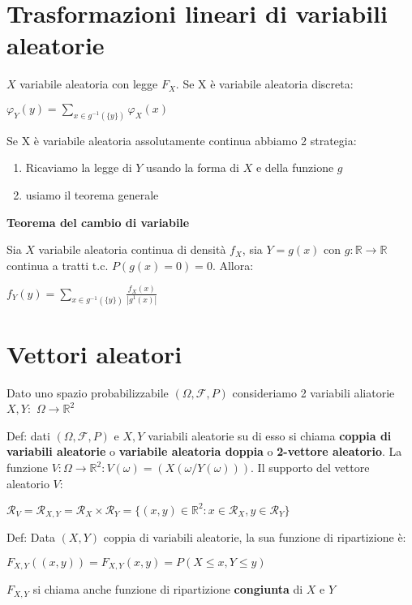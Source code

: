 \documentclass[11pt, letterpaper]{article}
\begin{document}
\newpage
\section{Trasformazioni lineari di variabili aleatorie}

$X$ variabile aleatoria con legge $F_{X}$. Se X è variabile aleatoria discreta:
\begin{center}
    $\varphi_{Y}(y)=\sum_{x\in g^{-1}(\{y\})}\varphi_{X}(x)$
\end{center}
Se X è variabile aleatoria assolutamente continua abbiamo 2 strategia:
\begin{enumerate}
    \item Ricaviamo la legge di $Y$ usando la forma di $X$ e della funzione $g$
    \item usiamo il teorema generale
\end{enumerate}

\textbf{Teorema del cambio di variabile}

Sia $X$ variabile aleatoria continua di densità $f_{X}$, sia $Y=g(x)$ con $g:\mathbb{R}\rightarrow\mathbb{R}$
continua a tratti t.c. $P(g(x)=0)=0$. Allora:
\begin{center}
    $f_{Y}(y)=\sum_{x\in g^{-1}(\{y\})}\frac{f_{X}(x)}{|g^{1}(x)|} $
\end{center}

\section{Vettori aleatori}
Dato uno spazio probabilizzabile $(\Omega,\mathcal{F},P)$ consideriamo 2 variabili aliatorie $X,Y: $
$\Omega\rightarrow$$\mathbb{R}^{2}$

Def: dati $(\Omega,\mathcal{F},P)$ e $X,Y$ variabili aleatorie su di esso si chiama \textbf{coppia di variabili aleatorie}
o \textbf{variabile aleatoria doppia} o \textbf{2-vettore aleatorio}. La funzione $V:\Omega\rightarrow\mathbb{R}^{2}:
V(\omega)=(X(\omega/Y(\omega)))$. Il supporto del vettore aleatorio $V$:
\begin{center}
    $\mathcal{R}_{V}=\mathcal{R}_{X,Y}=\mathcal{R}_{X}\times\mathcal{R}_{Y}=\{(x,y)\in\mathbb{R}^{2}:x\in\mathcal{R}_{X}
    , y\in\mathcal{R}_{Y} \}$
\end{center}
Def: Data $(X,Y)$ coppia di variabili aleatorie, la sua funzione di ripartizione è:
\begin{center}
    $F_{X,Y}((x,y))=F_{X,Y}(x,y)=P(X\leq x, Y\leq y)$
\end{center}
$F_{X,Y}$ si chiama anche funzione di ripartizione \textbf{congiunta} di $X$ e $Y$
\end{document}
